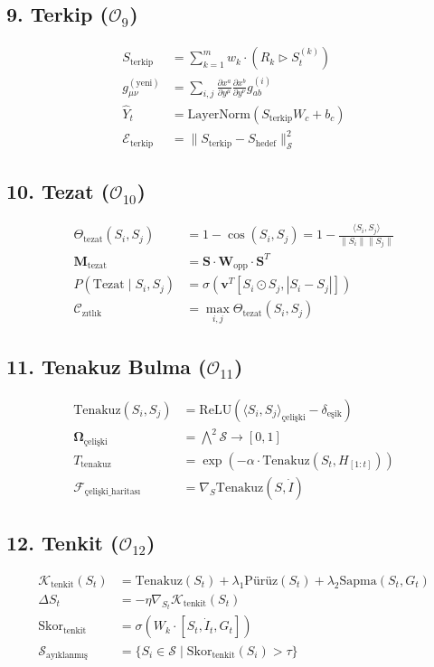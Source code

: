 \documentclass[11pt, a4paper]{article}
\begin{document}
\subsection{9. Terkip ($\mathcal{O}_9$)}
\begin{align}
S_{\text{terkip}} &= \sum_{k=1}^m w_k \cdot \left( R_k \triangleright S_t^{(k)} \right) \\
g_{\mu\nu}^{(\text{yeni})} &= \sum_{i,j} \frac{\partial x^a}{\partial y^\mu} \frac{\partial x^b}{\partial y^\nu} g_{ab}^{(i)} \\
\hat{Y}_t &= \text{LayerNorm}(S_{\text{terkip}} W_c + b_c) \\
\mathcal{E}_{\text{terkip}} &= \| S_{\text{terkip}} - S_{\text{hedef}} \|_{\mathcal{S}}^2
\end{align}

\subsection{10. Tezat ($\mathcal{O}_{10}$)}
\begin{align}
\Theta_{\text{tezat}}(S_i, S_j) &= 1 - \cos(S_i, S_j) = 1 - \frac{\langle S_i, S_j \rangle}{\|S_i\| \|S_j\|} \\
\mathbf{M}_{\text{tezat}} &= \mathbf{S} \cdot \mathbf{W}_{\text{opp}} \cdot \mathbf{S}^T \\
P(\text{Tezat} \mid S_i, S_j) &= \sigma\left( \mathbf{v}^T [S_i \odot S_j, |S_i - S_j|] \right) \\
\mathcal{C}_{\text{zıtlık}} &= \max_{i,j} \Theta_{\text{tezat}}(S_i, S_j)
\end{align}

\subsection{11. Tenakuz Bulma ($\mathcal{O}_{11}$)}
\begin{align}
\text{Tenakuz}(S_i, S_j) &= \text{ReLU}\left( \langle S_i, S_j \rangle_{\text{çelişki}} - \delta_{\text{eşik}} \right) \\
\mathbf{\Omega}_{\text{çelişki}} &= \bigwedge^2 \mathcal{S} \to [0, 1] \\
T_{\text{tenakuz}} &= \exp\left( -\alpha \cdot \text{Tenakuz}(S_t, H_{[1:t]}) \right) \\
\mathcal{F}_{\text{çelişki\_haritası}} &= \nabla_S \text{Tenakuz}(S, \dot{I})
\end{align}

\subsection{12. Tenkit ($\mathcal{O}_{12}$)}
\begin{align}
\mathcal{K}_{\text{tenkit}}(S_t) &= \text{Tenakuz}(S_t) + \lambda_1 \text{Pürüz}(S_t) + \lambda_2 \text{Sapma}(S_t, G_t) \\
\Delta S_t &= -\eta \nabla_{S_t} \mathcal{K}_{\text{tenkit}}(S_t) \\
\text{Skor}_{\text{tenkit}} &= \sigma\left( W_k \cdot [S_t, \dot{I}_t, G_t] \right) \\
\mathcal{S}_{\text{ayıklanmış}} &= \{ S_i \in \mathcal{S} \mid \text{Skor}_{\text{tenkit}}(S_i) > \tau \}
\end{align}
\end{document}
